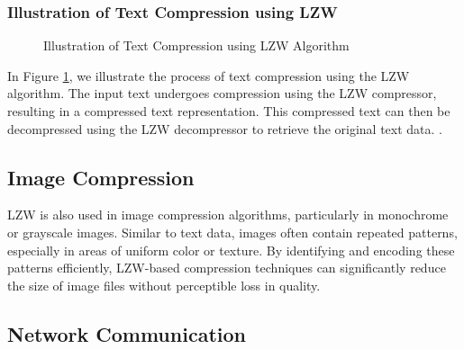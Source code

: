 \documentclass[12pt, a4paper]{article}
\begin{document}
\subsubsection{Illustration of Text Compression using LZW}

\begin{figure}[htbp]
    \centering
    \caption{Illustration of Text Compression using LZW Algorithm}
    \label{fig:lzw_text_compression}
\end{figure}

In Figure \ref{fig:lzw_text_compression}, we illustrate the process of text compression using the LZW algorithm. The input text undergoes compression using the LZW compressor, resulting in a compressed text representation. This compressed text can then be decompressed using the LZW decompressor to retrieve the original text data.
.\cite{mackay2003information}

\subsection{Image Compression}

LZW is also used in image compression algorithms, particularly in monochrome or grayscale images. Similar to text data, images often contain repeated patterns, especially in areas of uniform color or texture. By identifying and encoding these patterns efficiently, LZW-based compression techniques can significantly reduce the size of image files without perceptible loss in quality.\cite{bloom1970space}

\subsection{Network Communication}
\end{document}
